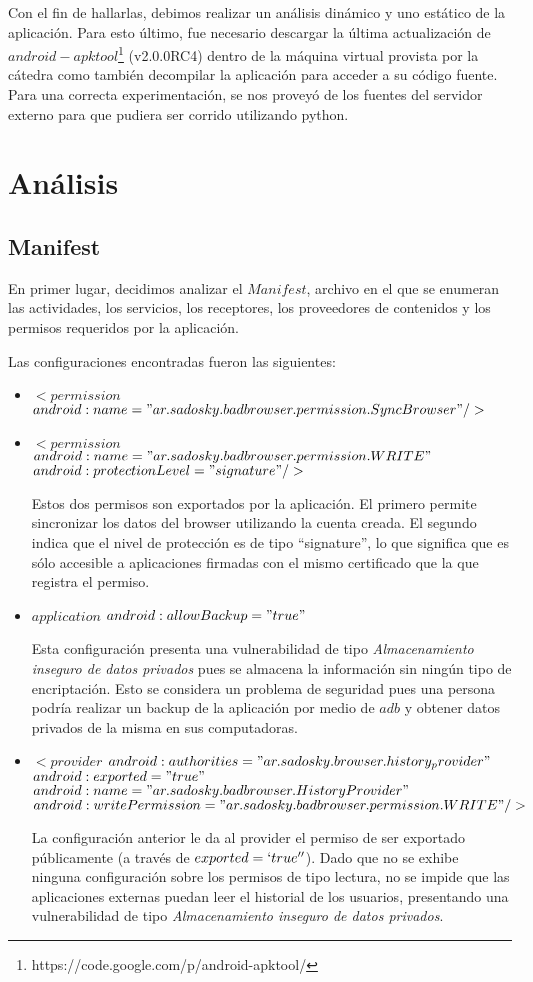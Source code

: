 \documentclass[10pt, a4paper]{article}
\begin{document}
Con el fin de hallarlas, debimos realizar un análisis dinámico y uno estático de la aplicación. Para esto último, fue necesario descargar la última actualización de $android-apktool$\footnote{https://code.google.com/p/android-apktool/} (v2.0.0RC4) dentro de la máquina virtual provista por la cátedra como también decompilar la aplicación para acceder a su código fuente.
Para una correcta experimentación, se nos proveyó de los fuentes del servidor externo para que pudiera ser corrido utilizando python.

\newpage
\section{Análisis}

\subsection{Manifest}

En primer lugar, decidimos analizar el $Manifest$, archivo en el que se enumeran las actividades, los servicios, los receptores, los proveedores de contenidos y los permisos requeridos por la aplicación. 

Las configuraciones encontradas fueron las siguientes:
\begin{itemize}
\item $<permission$ $android:name="ar.sadosky.badbrowser.permission.SyncBrowser"/>$ 
\item $<permission$ $android:name="ar.sadosky.badbrowser.permission.WRITE"$ $android:protectionLevel="signature"/>$ 

Estos dos permisos son exportados por la aplicación. El primero permite sincronizar los datos del browser utilizando la cuenta creada. El segundo indica que el nivel de protección es de tipo ``signature'', lo que significa que es sólo accesible a aplicaciones firmadas con el mismo certificado que la que registra el permiso.

\item $application$ $android:allowBackup="true"$

Esta configuración presenta una vulnerabilidad de tipo \textit{Almacenamiento inseguro de datos privados} pues se almacena la información sin ningún tipo de encriptación. Esto se considera un problema de seguridad pues una persona podría realizar un backup de la aplicación por medio de $adb$ y obtener datos privados de la misma en sus computadoras.


\item $<provider$ $android:authorities="ar.sadosky.browser.history_provider"$ $android:exported="true"$ $android:name="ar.sadosky.badbrowser.HistoryProvider"$ $android:writePermission="ar.sadosky.badbrowser.permission.WRITE"/>$

La configuración anterior le da al provider el permiso de ser exportado públicamente (a través de $exported=`true''$). 
Dado que no se exhibe ninguna configuración sobre los permisos de tipo lectura, no se impide que las aplicaciones externas puedan leer el historial de los usuarios, presentando una vulnerabilidad de tipo \textit{Almacenamiento inseguro de datos privados}. 

\end{itemize}
\end{document}
